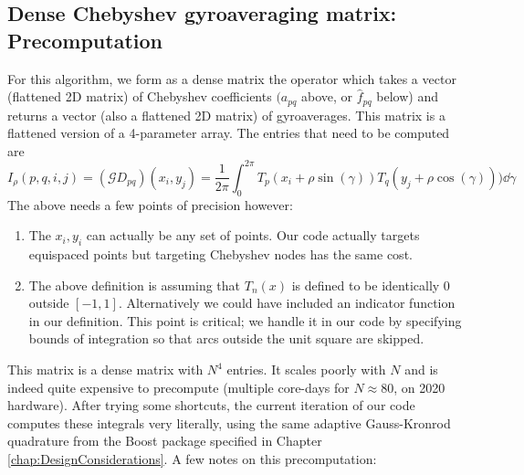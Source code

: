 \subsection{Dense Chebyshev gyroaveraging matrix:  Precomputation \label{chebPrecomp}} 
For this algorithm, we form as a dense matrix the operator which takes a vector (flattened 2D matrix) of Chebyshev coefficients $(a_{pq}$ above, or $\hat{f}_{pq}$ below) and returns a vector (also a flattened 2D matrix) of gyroaverages.  This matrix is a flattened version of a 4-parameter array.  The entries that need to be computed are
\[ I_{\rho}(p,q,i,j) =  (\mathcal{G}D_{pq})(x_i,y_j) =  
\frac{1}{2 \pi}\int_{0}^{2\pi} T_p(x_i+\rho \sin(\gamma))T_q (y_j + \rho \cos(\gamma))) \dd{\gamma}\]
The above needs a few points of precision however:
\begin{enumerate}
	\item The $x_i,y_i$ can actually be any set of points.  Our code actually targets equispaced points but targeting Chebyshev nodes has the same cost.
	\item The above definition is assuming that $T_n(x)$ is defined to be identically 0 outside $[-1,1]$.  Alternatively we could have included an indicator function in our definition.  This point is critical; we handle it in our code by specifying bounds of integration so that arcs outside the unit square are skipped.   
\end{enumerate}
This matrix is a dense matrix with $N^4$ entries. It scales poorly with $N$ and is indeed quite expensive to precompute (multiple core-days for $N \approx 80$, on 2020 hardware).  After trying some shortcuts, the current iteration of our code computes these integrals very literally, using the same adaptive Gauss-Kronrod quadrature from the Boost package specified in Chapter \ref{chap:DesignConsiderations}.
  A few notes on this precomputation:
